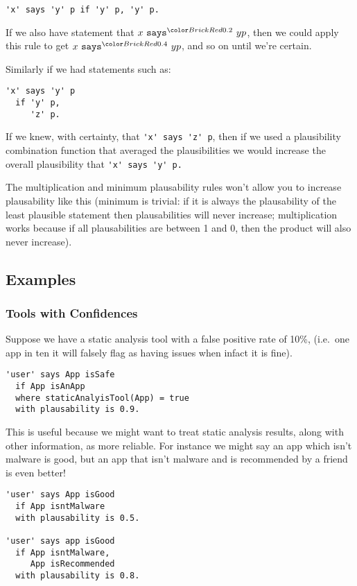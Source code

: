 \documentclass[thesis.tex]{subfiles}
\begin{document}
\begin{lstlisting} 
'x' says 'y' p if 'y' p, 'y' p.
\end{lstlisting}

If we also have statement that $x \says{0.2} y p$,
then we could apply this rule to get $x \says{0.4} y p$, and so on
until we're certain.

Similarly if we had statements  such as:
\begin{lstlisting} 
'x' says 'y' p 
  if 'y' p,
     'z' p.
\end{lstlisting}

If we knew, with certainty, that \lstinline!'x' says 'z' p!, then if
we used a plausibility combination function that averaged the
plausibilities we would increase the overall plausibility that
\lstinline!'x' says 'y' p.!

The multiplication and minimum plausability rules won't allow you to
increase plausability like this (minimum is trivial: if it is always
the plausability of the least plausible statement then plausabilities
will never increase; multiplication works because if all
plausabilities are between 1 and 0, then the product will also never
increase).

\subsection{Examples}

\subsubsection{Tools with Confidences}

Suppose we have a static analysis tool with a false positive rate of
10\%, (i.e.~one app in ten it will falsely flag as having issues when
infact it is fine).

\begin{lstlisting}
'user' says App isSafe
  if App isAnApp
  where staticAnalyisTool(App) = true
  with plausability is 0.9.
\end{lstlisting}

This is useful because we might want to treat static analysis results,
along with other information, as more reliable.  For instance we might
say an app which isn't malware is good, but an app that isn't malware
and is recommended by a friend is even better!

\begin{lstlisting}
'user' says App isGood
  if App isntMalware
  with plausability is 0.5.

'user' says app isGood
  if App isntMalware,
     App isRecommended
  with plausability is 0.8.
\end{lstlisting}
\end{document}
